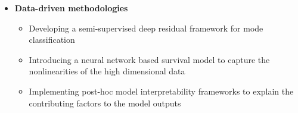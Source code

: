  \begin{itemize}
    \item \textbf{Data-driven methodologies}
    \begin{itemize}
      \item Developing a semi-supervised deep residual framework for mode classification
      \item Introducing a neural network based survival model to capture the nonlinearities of the high dimensional data
      \item Implementing post-hoc model interpretability frameworks to explain the contributing factors to the model outputs
    \end{itemize}

\end{itemize}  
    

    
   

